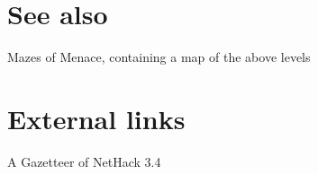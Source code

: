 \section{See also}
\label{1}

\begin{myitemize}\item{}Mazes of Menace\footnotemark[40], containing a map of the above levels
\end{myitemize}

\section{External links}
\label{2}

\begin{myitemize}\item{}A Gazetteer of NetHack 3.4\footnotemark[41]
\end{myitemize}
